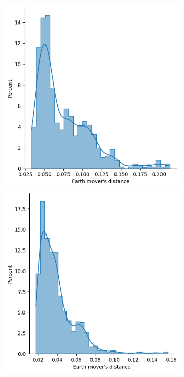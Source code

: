         \begin{figure}[htb]
          \centering
          \begin{subfigure}[t]{\textwidth+20pt\relax}
            \includegraphics[width=\dimexpr\linewidth-20pt\relax]{figures/dropcon/all_emds.png}
            \includegraphics[width=\dimexpr\linewidth-20pt\relax]{figures/dropout/all_emds.png}

\end{subfigure}
\end{figure}

